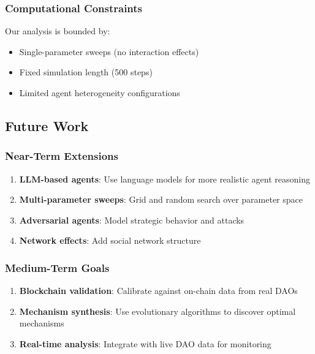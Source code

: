 \subsubsection{Computational Constraints}

Our analysis is bounded by:

\begin{itemize}
    \item Single-parameter sweeps (no interaction effects)
    \item Fixed simulation length (500 steps)
    \item Limited agent heterogeneity configurations
\end{itemize}

\subsection{Future Work}

\subsubsection{Near-Term Extensions}

\begin{enumerate}
    \item \textbf{LLM-based agents}: Use language models for more realistic agent reasoning
    \item \textbf{Multi-parameter sweeps}: Grid and random search over parameter space
    \item \textbf{Adversarial agents}: Model strategic behavior and attacks
    \item \textbf{Network effects}: Add social network structure
\end{enumerate}

\subsubsection{Medium-Term Goals}

\begin{enumerate}
    \item \textbf{Blockchain validation}: Calibrate against on-chain data from real DAOs
    \item \textbf{Mechanism synthesis}: Use evolutionary algorithms to discover optimal mechanisms
    \item \textbf{Real-time analysis}: Integrate with live DAO data for monitoring
\end{enumerate}

